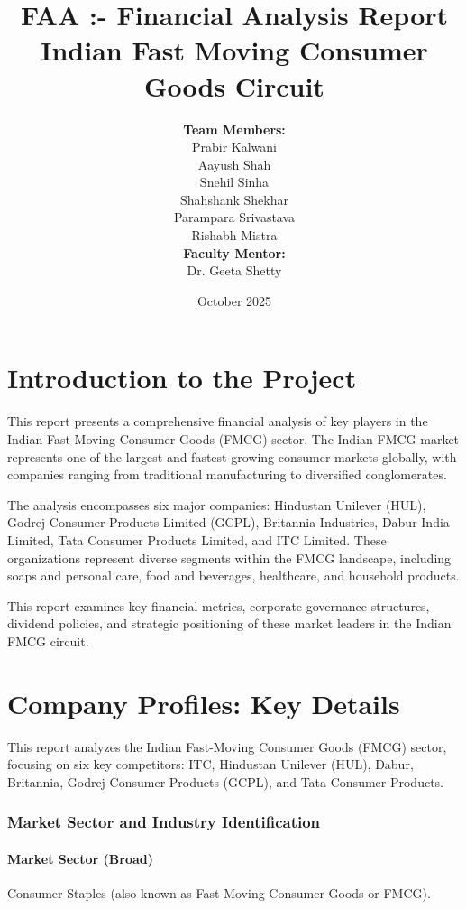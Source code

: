 \documentclass[12pt, a4paper]{report}
\title{\textbf{FAA :- Financial Analysis Report} \\ \vspace{0.5cm} \Large Indian Fast Moving Consumer Goods Circuit}
\author{
    \textbf{Team Members:} \\
    \vspace{0.3cm}
    Prabir Kalwani \\
    Aayush Shah \\
    Snehil Sinha \\
    Shahshank Shekhar \\
    Parampara Srivastava \\
    Rishabh Mistra \\
    \vspace{0.8cm}
    \textbf{Faculty Mentor:} \\
    Dr. Geeta Shetty
}
\date{October 2025}
\begin{document}
\maketitle

\newpage
\tableofcontents
\newpage

\chapter{Introduction to the Project}

This report presents a comprehensive financial analysis of key players in the Indian Fast-Moving Consumer Goods (FMCG) sector. The Indian FMCG market represents one of the largest and fastest-growing consumer markets globally, with companies ranging from traditional manufacturing to diversified conglomerates.

The analysis encompasses six major companies: Hindustan Unilever (HUL), Godrej Consumer Products Limited (GCPL), Britannia Industries, Dabur India Limited, Tata Consumer Products Limited, and ITC Limited. These organizations represent diverse segments within the FMCG landscape, including soaps and personal care, food and beverages, healthcare, and household products.

This report examines key financial metrics, corporate governance structures, dividend policies, and strategic positioning of these market leaders in the Indian FMCG circuit.

\newpage

\chapter{Company Profiles: Key Details}

This report analyzes the Indian Fast-Moving Consumer Goods (FMCG) sector, focusing on six key competitors: ITC, Hindustan Unilever (HUL), Dabur, Britannia, Godrej Consumer Products (GCPL), and Tata Consumer Products.

\subsection{Market Sector and Industry Identification}

\subsubsection*{Market Sector (Broad)}
Consumer Staples (also known as Fast-Moving Consumer Goods or FMCG).
\end{document}
